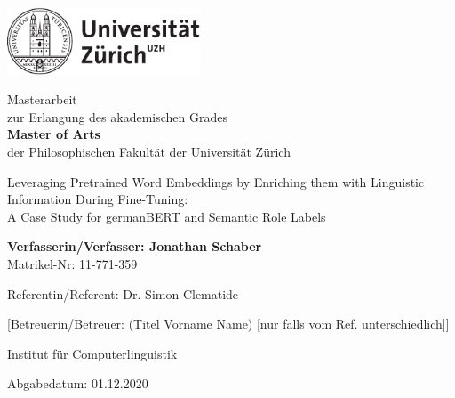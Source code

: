 \begin{titlepage}
\includegraphics[height=20mm]{images/uzh_logo_d_pos}\\

\begin{center}

{\sffamily
Masterarbeit \\
zur Erlangung des akademischen Grades \\
\textbf{Master of Arts} \\
der Philosophischen Fakultät der Universität Zürich \\

\vspace{2cm}

{\Large Leveraging Pretrained Word Embeddings by Enriching them with Linguistic Information During Fine-Tuning: \\
	A Case Study for germanBERT and Semantic Role Labels}\\

\vspace{4cm}

\textbf{Verfasserin/Verfasser: Jonathan Schaber} \\
	Matrikel-Nr: 11-771-359 \\

\vspace{2cm}

Referentin/Referent: Dr. Simon Clematide

[Betreuerin/Betreuer: (Titel Vorname Name) {\small [nur falls vom Ref. unterschiedlich]}]

Institut f\"ur Computerlinguistik

\vfill Abgabedatum: 01.12.2020

\vspace{3cm}
}
\end{center}

\end{titlepage}

\newpage
